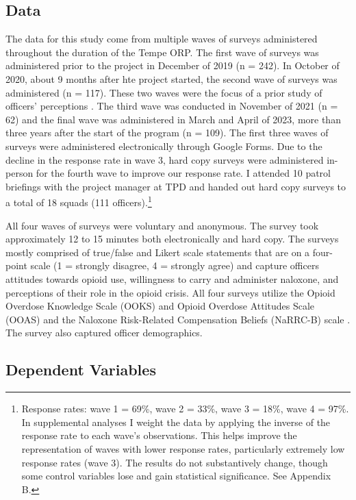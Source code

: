 \subsection{Data}

The data for this study come from multiple waves of surveys administered throughout the duration of the Tempe ORP. The first wave of surveys was administered prior to the project in December of 2019 (n = 242). In October of 2020, about 9 months after hte project started, the second wave of surveys was administered (n = 117). These two waves were the focus of a prior study of officers’ perceptions \parencite{white_narcan_2021}. The third wave was conducted in November of 2021 (n = 62) and the final wave was administered in March and April of 2023, more than three years after the start of the program (n = 109). The first three waves of surveys were administered electronically through Google Forms. Due to the decline in the response rate in wave 3, hard copy surveys were administered in-person for the fourth wave to improve our response rate. I attended 10 patrol briefings with the project manager at TPD and handed out hard copy surveys to a total of 18 squads (111 officers).\footnote{Response rates: wave 1 = 69\%, wave 2 = 33\%, wave 3 = 18\%, wave 4 = 97\%. In supplemental analyses I weight the data by applying the inverse of the response rate to each wave's observations. This helps improve the representation of waves with lower response rates, particularly extremely low response rates (wave 3). The results do not substantively change, though some control variables lose and gain statistical significance. See Appendix B.} 

All four waves of surveys were voluntary and anonymous. The survey took approximately 12 to 15 minutes both electronically and hard copy. The surveys mostly comprised of true/false and Likert scale statements that are on a four-point scale (1 = strongly disagree, 4 = strongly agree) and capture officers attitudes towards opioid use, willingness to carry and administer naloxone, and perceptions of their role in the opioid crisis. All four surveys utilize the Opioid Overdose Knowledge Scale (OOKS) and Opioid Overdose Attitudes Scale (OOAS) \parencite{williams_development_2013} and the Naloxone Risk-Related Compensation Beliefs (NaRRC-B) scale \parencite{winograd_concerns_2019}. The survey also captured officer demographics.

\subsection{Dependent Variables}


